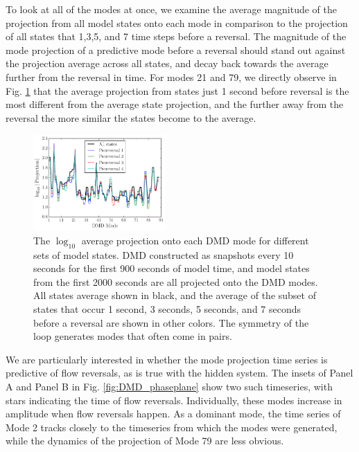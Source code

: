 \documentclass[pre,twocolumn,twoside,byrevtex,superscriptaddress]{revtex4}
\begin{document}
To look at all of the modes at once, we examine the average magnitude of the projection from all model states onto each mode in comparison to the projection of all states that 1,3,5, and 7 time steps before a reversal.
The magnitude of the mode projection of a predictive mode before a reversal should stand out against the projection average across all states, and decay back towards the average further from the reversal in time.
For modes 21 and 79, we directly observe in Fig. \ref{fig:DMD_modes} that the average projection from states just 1 second before reversal is the most different from the average state projection, and the further away from the reversal the more similar the states become to the average.

\begin{figure}[h]
  \centering
  \includegraphics[width=0.45\textwidth]{fig10_2015-10-02-12-51-DMD_modes_pre_reversals.pdf}
  \caption[]{
    The $\log_{10}$ average projection onto each DMD mode for different sets of model states.
    DMD constructed as snapshots every 10 seconds for the first 900 seconds of model time, and model states from the first 2000 seconds are all projected onto the DMD modes.
    All states average shown in black, and the average of the subset of states that occur 1 second, 3 seconds, 5 seconds, and 7 seconds before a reversal are shown in other colors.
    The symmetry of the loop generates modes that often come in pairs.
      }
  \label{fig:DMD_modes}
\end{figure}

We are particularly interested in whether the mode projection time series is predictive of flow reversals, as is true with the hidden system.
The insets of Panel A and Panel B in Fig. \ref{fig:DMD_phaseplane} show two such timeseries, with stars indicating the time of flow reversals.
Individually, these modes increase in amplitude when flow reversals happen.
As a dominant mode, the time series of Mode 2 tracks closely to the timeseries from which the modes were generated, while the dynamics of the projection of Mode 79 are less obvious.
\end{document}
